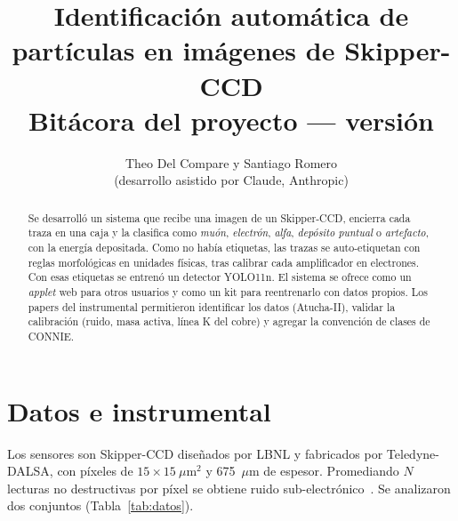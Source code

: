 \documentclass[10pt,a4paper]{article}
\title{\vspace{-8mm}\textbf{Identificación automática de partículas en imágenes de Skipper-CCD}\\[2pt]
\large Bitácora del proyecto --- versión \version}
\author{Theo Del Compare \quad y \quad Santiago Romero \\ {\small (desarrollo asistido por Claude, Anthropic)}}
\date{\fecha}
\begin{document}
\maketitle
\vspace{-6mm}

\begin{abstract}
\noindent Se desarrolló un sistema que recibe una imagen de un Skipper-CCD, encierra cada traza en una caja y
la clasifica como \emph{muón}, \emph{electrón}, \emph{alfa}, \emph{depósito puntual} o \emph{artefacto},
con la energía depositada. Como no había etiquetas, las trazas se auto-etiquetan con reglas morfológicas
en unidades físicas, tras calibrar cada amplificador en electrones. Con esas etiquetas se entrenó un
detector YOLO11n. El sistema se ofrece como un \emph{applet} web para otros usuarios y como un kit para
reentrenarlo con datos propios. Los papers del instrumental permitieron identificar los datos (Atucha-II),
validar la calibración (ruido, masa activa, línea K del cobre) y agregar la convención de clases de CONNIE.
\end{abstract}

\section{Datos e instrumental}
Los sensores son Skipper-CCD diseñados por LBNL y fabricados por Teledyne-DALSA, con píxeles de
$15\times15~\mu$m$^2$ y 675~$\mu$m de espesor. Promediando $N$ lecturas no destructivas por píxel se
obtiene ruido sub-electrónico~\cite{tiffenberg2017}. Se analizaron dos conjuntos (Tabla~\ref{tab:datos}).
\end{document}

